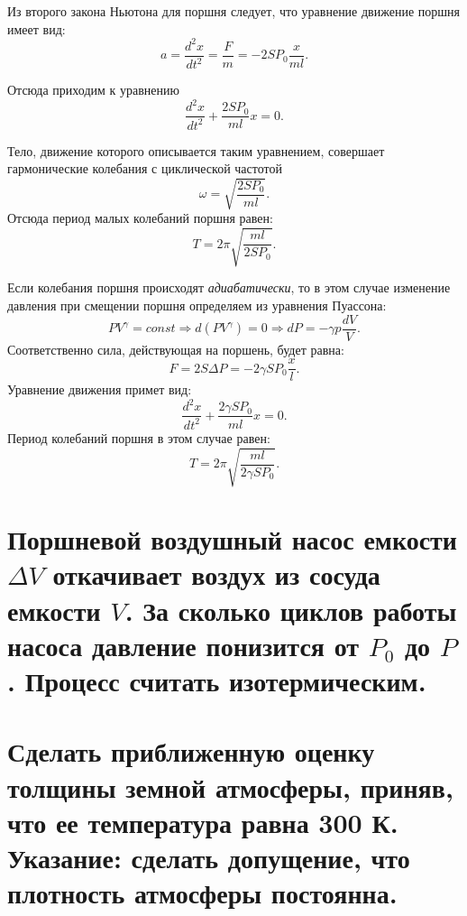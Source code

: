 Из второго закона Ньютона для поршня следует, что уравнение движение поршня имеет вид:
\begin{equation}
  a = \frac{d^2x}{dt^2} = \frac{F}{m} = -2SP_0\frac{x}{ml}.
\end{equation}

Отсюда приходим к уравнению
\begin{equation}
  \frac{d^2x}{dt^2}+\frac{2SP_0}{ml}x = 0.
\end{equation}

Тело, движение которого описывается таким уравнением, совершает
гармонические колебания с циклической частотой
\begin{equation}
  \omega = \sqrt{\frac{2SP_0}{ml}}.
\end{equation}
Отсюда период малых колебаний поршня равен:
\begin{equation}
  T = 2\pi\sqrt{\frac{ml}{2SP_0}}.
\end{equation}

Если колебания поршня происходят \emph{адиабатически}, то в этом случае изменение давления при смещении поршня определяем из уравнения Пуассона:
\begin{equation}
  PV^\gamma = const \Rightarrow d(PV^\gamma) = 0 \Rightarrow dP = - \gamma p \frac{dV}{V}.
\end{equation}
Соответственно сила, действующая на поршень, будет равна:
\begin{equation}
  F = 2 S \Delta P = - 2\gamma SP_0\frac{x}{l}.
\end{equation}
Уравнение движения примет вид:
\begin{equation}
  \frac{d^2x}{dt^2}+\frac{2\gamma SP_0}{ml}x = 0.
\end{equation} 
Период колебаний поршня в этом случае равен:
\begin{equation}
  T = 2\pi\sqrt{\frac{ml}{2\gamma SP_0}}.
\end{equation}

\section{\boldmath Поршневой воздушный насос емкости $\Delta V$ откачивает воздух из сосуда емкости $V$. За сколько циклов работы насоса давление понизится от $P_0$ до $P$. Процесс считать изотермическим.}

\section{Сделать приближенную оценку толщины земной атмосферы, приняв, что ее температура равна 300 К. \textup{\normalfont  Указание: сделать допущение, что плотность атмосферы постоянна.}}

